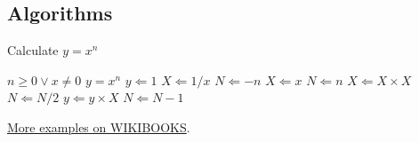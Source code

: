 \subsection{Algorithms}
\label{ss:Algorithms}
\begin{algorithm}[h]                      %
\caption{Calculate $y = x^n$}          %
\label{alg1}                           %
\begin{algorithmic}                    %
    \Require $n \geq 0 \vee x \neq 0$
    \Ensure $y = x^n$
    \State $y \Leftarrow 1$
        \State $X \Leftarrow 1 / x$
        \State $N \Leftarrow -n$
    \Else
        \State $X \Leftarrow x$
        \State $N \Leftarrow n$
    \EndIf
            \State $X \Leftarrow X \times X$
            \State $N \Leftarrow N / 2$
        \Else[$N$ is odd]
            \State $y \Leftarrow y \times X$
            \State $N \Leftarrow N - 1$
        \EndIf
    \EndWhile
\end{algorithmic}
\end{algorithm}
\href{http://en.wikibooks.org/wiki/LaTeX/Algorithms_and_Pseudocode}{More examples on WIKIBOOKS}.

